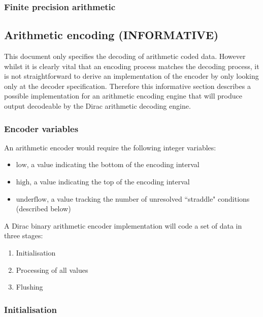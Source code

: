 \begin{informative*}
\subsubsection{Finite precision arithmetic}

\subsection{Arithmetic encoding (INFORMATIVE)}
\end{informative*}

This document only specifies the decoding of arithmetic coded data. 
However whilst it is clearly vital that an encoding process matches the decoding
process, it is not straightforward to derive an implementation of the
encoder by only looking only at the decoder specification. Therefore this
informative section describes a possible implementation for an
arithmetic encoding engine that will produce output decodeable by
the Dirac arithmetic decoding engine.

\subsubsection{Encoder variables}

An arithmetic encoder would require the following integer variables:

\begin{itemize}
\item $\text{low}$, a value indicating the bottom of the encoding interval
\item $\text{high}$, a value indicating the top of the encoding interval
\item $\text{underflow}$, a value tracking the number of unresolved ``straddle" conditions 
(described below)
\end{itemize}

A Dirac binary arithmetic encoder implementation will code a set of data in three stages:

\begin{enumerate}
\item Initialisation
\item Processing of all values
\item Flushing
\end{enumerate}

\subsubsection{Initialisation}

